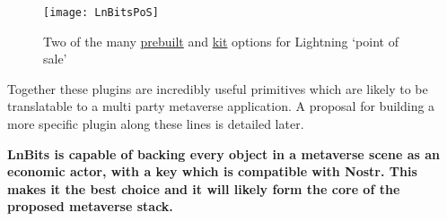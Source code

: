 \begin{figure}
  \centering
    \texttt{[image: LnBitsPoS]}
  \caption{Two of the many \href{https://rapaygo.com/}{prebuilt} and \href{https://github.com/arcbtc/LNURLPoS}{kit} options for Lightning `point of sale'}
  \label{fig:LnBitsPoS}
\end{figure}
Together these plugins are incredibly useful primitives which are likely to be translatable to a multi party metaverse application. A proposal for building a more specific plugin along these lines is detailed later.\par
\textbf{LnBits is capable of backing every object in a metaverse scene as an economic actor, with a key which is compatible with Nostr. This makes it the best choice and it will likely form the core of the proposed metaverse stack.}
\begin{comment}
\subsection{Etleneum}
Etleneum is a centralised smart contract platform built around Lightning invoices. It is most notable as a sign of things to come. There are \href{https://etleneum.com/#/contracts}{many small contracts} available to try on the site, such as a \href{https://etleneum.com/#/contract/c8w0c13v75}{simple market} for moving value between lightning and Bitcoin layer 1, or this \href{https://simple-auction.etleneum.com/}{simple auction}.  Contracts are able to operate on data drawn from the wider web, and automatically send and receive lightning payments based on conditional states. It should be viewed as an experiment which allows tinkering in smart contracts, and therefore potentially useful for the software proposed in the final section. There are \href{https://notgeld.medium.com/lightning-network-computation-layer-27c7ba81a214}{suggestions} that this approach might (with some work) allow layer 3 computation more like Ethereum etc.
\subsection{Message passing}
It is possible to pass data alongside lightning payments, routing messages between parties across the global network. This means that a host of other applications can inherit the privacy and censorship resistance of the Lightning network. First amongst these has been simple message passing and group messenger clients such as Sphinx, Juggernaut, Impervious messenger, and RGB Lightning chat. To be clear, this is considered by some to be a misappropriation of the function of the network, and pretty silly given the number of end to end encrypted chat clients available. One more developed use case has been demonstrated by the Impervious development team; they use the message passing capability to negotiate a virtual private network between two parties, using open source software. This allows a secure side channel between internet IP addresses to be opened without a trusted third party. This in itself is a much sought after function of privacy minded networking, and the basis for much of their Impervious browser feature set. 
\end{comment}
